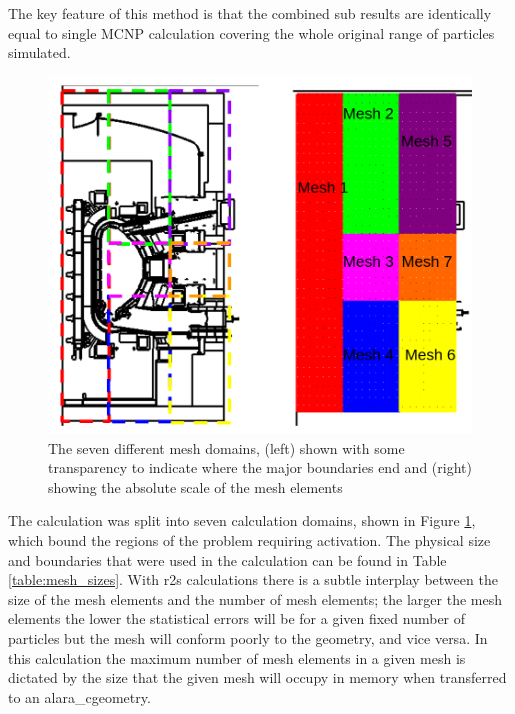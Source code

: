 \documentclass[12pt]{article}
\begin{document}
The key feature of this method is that the combined sub results are identically
equal to single MCNP calculation covering the whole original range of particles
simulated.
\begin{figure}[ht!]
  \centering
  \includegraphics[scale=0.4]{../plots/transport/job_splits.png}
  \caption{The seven different mesh domains, (left) shown with some transparency
           to indicate where the major boundaries end and (right) showing the
           absolute scale of the mesh elements}
  \label{fig:mesh_domains}
\end{figure}

The calculation was split into seven calculation domains, shown in Figure
\ref{fig:mesh_domains}, which bound the regions of the problem requiring
activation. The physical size and boundaries that were used in the calculation
can be found in Table \ref{table:mesh_sizes}. With \gls{r2s} calculations there is a
subtle interplay between the size of the mesh elements and the number of mesh
elements; the larger the mesh elements the lower the statistical errors will be
for a given fixed number of particles but the mesh will conform poorly to the
geometry, and vice versa. In this calculation the maximum number of mesh
elements in a given mesh is dictated by the size that the given mesh will
occupy in memory when transferred to an \gls{alara_c}geometry. 
\end{document}
